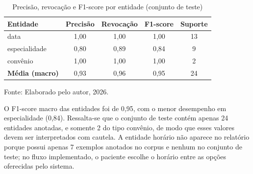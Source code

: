 \documentclass[12pt,a4paper]{extarticle}
\begin{document}
\begin{table}[H]
\centering
\caption{Precisão, revocação e F1-score por entidade (conjunto de teste)}
\label{tab:nlu_entidade}
\begin{tabular}{p{4cm}cccc}
\hline
\textbf{Entidade} & \textbf{Precisão} & \textbf{Revocação} & \textbf{F1-score} & \textbf{Suporte} \\
\hline
data & 1,00 & 1,00 & 1,00 & 13 \\
especialidade & 0,80 & 0,89 & 0,84 & 9 \\
convênio & 1,00 & 1,00 & 1,00 & 2 \\
\hline
\textbf{Média (macro)} & 0,93 & 0,96 & 0,95 & 24 \\
\hline
\end{tabular}
\vspace{0.3cm}

\footnotesize{Fonte: Elaborado pelo autor, 2026.}
\end{table}

O F1-score macro das entidades foi de 0,95, com o menor desempenho em especialidade (0,84). Ressalta-se que o conjunto de teste contém apenas 24 entidades anotadas, e somente 2 do tipo convênio, de modo que esses valores devem ser interpretados com cautela. A entidade horário não aparece no relatório porque possui apenas 7 exemplos anotados no corpus e nenhum no conjunto de teste; no fluxo implementado, o paciente escolhe o horário entre as opções oferecidas pelo sistema.
\end{document}
